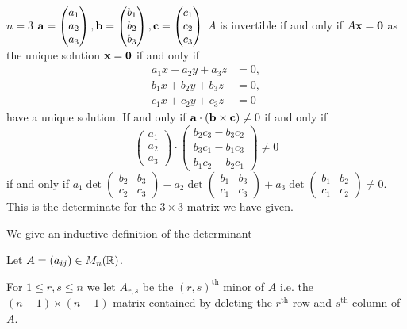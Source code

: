 \documentclass[10pt, a4paper]{article}
\begin{document}
$n = 3$
$\mathbf{a} = \begin{pmatrix}
    a_1 \\ a_2 \\ a_3
\end{pmatrix}, \mathbf{b} = \begin{pmatrix}
    b_1 \\ b_2 \\ b_3
\end{pmatrix}, \mathbf{c} = \begin{pmatrix}
    c_1 \\ c_2 \\ c_3
\end{pmatrix}$
$A$ is invertible if and only if $A\mathbf{x} = \mathbf{0}$ as the unique solution $\mathbf{x} = \mathbf{0}$
if and only if
\begin{align*}
    a_1x + a_2y + a_3z &= 0, \\
    b_1x + b_2y + b_3z &= 0, \\
    c_1x + c_2y + c_3z &= 0
\end{align*}
have a unique solution.
If and only if $\mathbf{a}\cdot (\mathbf{b}\times \mathbf{c}) \neq 0$
if and only if
\[
\begin{pmatrix}
    a_1 \\ a_2 \\ a_3
\end{pmatrix}
\cdot
\begin{pmatrix}
    b_2c_3 - b_3c_2 \\
    b_3c_1 - b_1c_3 \\
    b_1c_2 - b_2c_1
\end{pmatrix}
\neq 0
\]
if and only if
$a_1 \det\begin{pmatrix}
    b_2 & b_3 \\
    c_2 & c_3
\end{pmatrix} - a_2\det\begin{pmatrix}
    b_1 & b_3 \\ c_1 & c_3
\end{pmatrix} + a_3\det\begin{pmatrix}
    b_1 & b_2 \\ c_1 & c_2
\end{pmatrix} \neq 0$.
This is the determinate for the $3 \times 3$ matrix we have given.

We give an inductive definition of the determinant

Let $A = (a_{ij}) \in M_n(\mathbb{R})$.

For $1 \leq r, s \leq n$ we let
$A_{r, s}$ be the $(r, s)^{\text{th}}$ minor of $A$ i.e. the $(n - 1) \times (n - 1)$ matrix contained by deleting the $r^{\text{th}}$ row and $s ^ {\text{th}}$ column of $A$.
\end{document}
